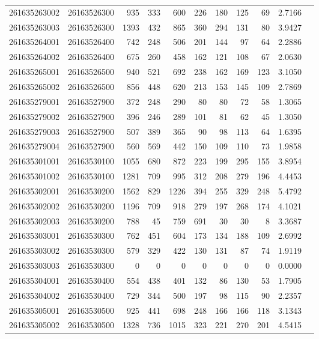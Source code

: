 \documentclass[11pt,landscape]{article}
\begin{document}
{\begin{longtable}[]{@{}lrrrrrrrrrr@{}}
261635263002 & 26163526300 & 935 & 333 & 600 & 226 & 180 & 125 & 69 & 2.7166 \\
261635263003 & 26163526300 & 1393 & 432 & 865 & 360 & 294 & 131 & 80 & 3.9427 \\
261635264001 & 26163526400 & 742 & 248 & 506 & 201 & 144 & 97 & 64 & 2.2886 \\
261635264002 & 26163526400 & 675 & 260 & 458 & 162 & 121 & 108 & 67 & 2.0630 \\
261635265001 & 26163526500 & 940 & 521 & 692 & 238 & 162 & 169 & 123 & 3.1050 \\
261635265002 & 26163526500 & 856 & 448 & 620 & 213 & 153 & 145 & 109 & 2.7869 \\
261635279001 & 26163527900 & 372 & 248 & 290 & 80 & 80 & 72 & 58 & 1.3065 \\
261635279002 & 26163527900 & 396 & 246 & 289 & 101 & 81 & 62 & 45 & 1.3050 \\
261635279003 & 26163527900 & 507 & 389 & 365 & 90 & 98 & 113 & 64 & 1.6395 \\
261635279004 & 26163527900 & 560 & 569 & 442 & 150 & 109 & 110 & 73 & 1.9858 \\
261635301001 & 26163530100 & 1055 & 680 & 872 & 223 & 199 & 295 & 155 & 3.8954 \\
261635301002 & 26163530100 & 1281 & 709 & 995 & 312 & 208 & 279 & 196 & 4.4453 \\
261635302001 & 26163530200 & 1562 & 829 & 1226 & 394 & 255 & 329 & 248 & 5.4792 \\
261635302002 & 26163530200 & 1196 & 709 & 918 & 279 & 197 & 268 & 174 & 4.1021 \\
261635302003 & 26163530200 & 788 & 45 & 759 & 691 & 30 & 30 & 8 & 3.3687 \\
261635303001 & 26163530300 & 762 & 451 & 604 & 173 & 134 & 188 & 109 & 2.6992 \\
261635303002 & 26163530300 & 579 & 329 & 422 & 130 & 131 & 87 & 74 & 1.9119 \\
261635303003 & 26163530300 & 0 & 0 & 0 & 0 & 0 & 0 & 0 & 0.0000 \\
261635304001 & 26163530400 & 554 & 438 & 401 & 132 & 86 & 130 & 53 & 1.7905 \\
261635304002 & 26163530400 & 729 & 344 & 500 & 197 & 98 & 115 & 90 & 2.2357 \\
261635305001 & 26163530500 & 925 & 441 & 698 & 248 & 166 & 166 & 118 & 3.1343 \\
261635305002 & 26163530500 & 1328 & 736 & 1015 & 323 & 221 & 270 & 201 & 4.5415 \\

\end{longtable}}
\end{document}
